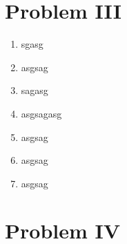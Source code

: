 \documentclass[letterpaper,11pt,twoside]{article}
\begin{document}
\section*{Problem III}
\begin{enumerate}[itemsep=0pt,topsep=0pt,label=\alph*)]
  \item sgasg
  \item asgsag
  \item sagasg
  \item asgsagasg
  \item asgsag
  \item asgsag
  \item asgsag
\end{enumerate}

\section*{Problem IV}




%
\end{document}
